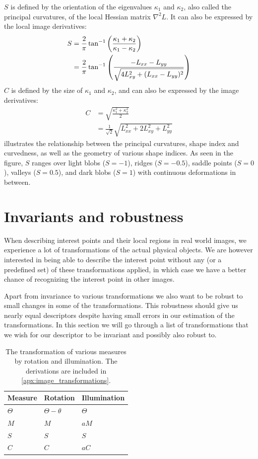 \documentclass[thesis.tex]{subfiles}
\begin{document}
$S$ is defined by the orientation of the eigenvalues $\kappa_1$ and $\kappa_2$, also called the principal curvatures, of the local Hessian matrix $\nabla^2 L$. It can also be expressed by the local image derivatives:
%
\begin{align}
S &= \frac{2}{\pi} \tan^{-1} \left( \frac{\kappa_1 + \kappa_2}{\kappa_1 - \kappa_2} \right) \\
&= \frac{2}{\pi} \tan^{-1} \left( \frac{-L_{xx} - L_{yy}}{\sqrt{4 L_{xy}^2 + (L_{xx} - L_{yy})^2}} \right)
\end{align}
%
$C$ is defined by the size of $\kappa_1$ and $\kappa_2$, and can also be expressed by the image derivatives:
%
\begin{align}
C &= \sqrt{\frac{\kappa_1^2 + \kappa_2^2}{2}} \\
&= \frac{1}{\sqrt2} \sqrt{L_{xx}^2 + 2 L_{xy}^2 + L_{yy}^2}
\end{align}
%
 illustrates the relationship between the principal curvatures, shape index and curvedness, as well as the geometry of various shape indices. As seen in the figure, $S$ ranges over light blobs ($S = -1$), ridges ($S = -0.5$), saddle points ($S = 0$), valleys ($S = 0.5$), and dark blobs ($S = 1$) with continuous deformations in between.
%
\section{Invariants and robustness}
When describing interest points and their local regions in real world images, we experience a lot of transformations of the actual physical objects. We are however interested in being able to describe the interest point without any (or a predefined set) of these transformations applied, in which case we have a better chance of recognizing the interest point in other images.

Apart from invariance to various transformations we also want to be robust to small changes in some of the transformations. This robustness should give us nearly equal descriptors despite having small errors in our estimation of the transformations.
In this section we will go through a list of transformations that we wish for our descriptor to be invariant and possibly also robust to.

\begin{table}[H]
	\centering
	\begin{tabular}{@{}l|ll@{}}
	Measure & Rotation & Illumination \\
	\hline
	$\Theta$ & $\Theta - \theta $ & $\Theta$ \\
	$M$ & $M$ & $a M$ \\
	$S$ & $S$ & $S$ \\
	$C$ & $C$ & $a C$ \\
	\end{tabular}
	\caption{The transformation of various measures by rotation and illumination. The derivations are included in \cref{apx:image_transformations}.}
	\label{tbl:measureInvariances}
\end{table}
\end{document}
